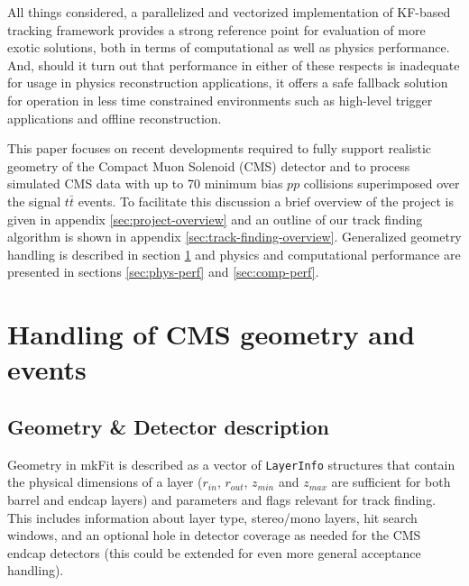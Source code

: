 \documentclass{webofc}
\def\mkfit{mkFit\xspace}
\def\stt#1{{\small\texttt{#1}}}
\begin{document}
All things considered, a parallelized and vectorized implementation of KF-based
tracking framework provides a strong reference point for evaluation of more
exotic solutions, both in terms of computational as well as physics
performance. And, should it turn out that performance in either of these
respects is inadequate for usage in physics reconstruction applications, it
offers a safe fallback solution for operation in less time constrained
environments such as high-level trigger applications and offline reconstruction.

This paper focuses on recent developments required to fully support realistic
geometry of the Compact Muon Solenoid (CMS) detector and to process simulated CMS data
with up to 70 minimum bias $pp$ collisions superimposed over the signal $t\bar{t}$
events. To facilitate this discussion a brief overview of the project is given
in appendix \ref{sec:project-overview} and an outline of our track finding
algorithm is shown in appendix \ref{sec:track-finding-overview}. Generalized
geometry handling is described in section \ref{sec:cms-geom-and-events} and
physics and computational performance are presented in sections
\ref{sec:phys-perf} and \ref{sec:comp-perf}.


\section{Handling of CMS geometry and events}
\label{sec:cms-geom-and-events}

\subsection{Geometry \& Detector description}

Geometry in \mkfit is described as a vector of \stt{LayerInfo} structures
that contain the physical dimensions of a layer ($r_{in}$, $r_{out}$, $z_{min}$
and $z_{max}$ are sufficient for both barrel and endcap layers) and parameters
and flags relevant for track finding. This includes information about layer
type, stereo/mono layers, hit search windows, and an optional hole in detector
coverage as needed for the CMS endcap detectors (this could be extended for
even more general acceptance handling).
\end{document}
